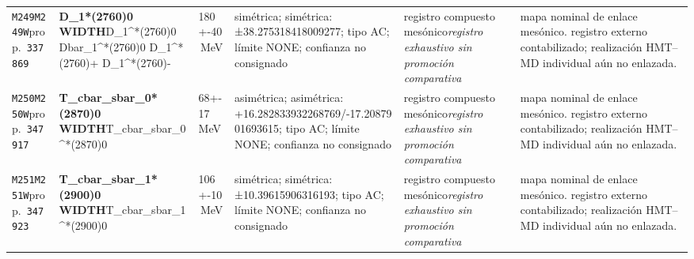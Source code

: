 \begin{landscape}
\begin{longtable}{L{1.85cm}L{4.45cm}L{2.35cm}L{4.05cm}L{3.35cm}L{7.15cm}}
\texttt{M249}\newline \texttt{M249W}\newline prop.\ \texttt{337869} & \textbf{D\_\allowbreak{}1*(2760)0 WIDTH}\newline D\_\allowbreak{}1\textasciicircum{}*(2760)0 \textbar{}\allowbreak{} Dbar\_\allowbreak{}1\textasciicircum{}*(2760)0 \textbar{}\allowbreak{} D\_\allowbreak{}1\textasciicircum{}*(2760)+ \textbar{}\allowbreak{} D\_\allowbreak{}1\textasciicircum{}*(2760)- & 180+-40\,MeV & simétrica; simétrica: ±38.275318418009277; tipo AC; límite NONE; confianza no consignado & registro compuesto mesónico\newline \emph{registro exhaustivo sin promoción comparativa} & mapa nominal de enlace mesónico. registro externo contabilizado; realización HMT--MD individual aún no enlazada. \\
\texttt{M250}\newline \texttt{M250W}\newline prop.\ \texttt{347917} & \textbf{T\_\allowbreak{}cbar\_\allowbreak{}sbar\_\allowbreak{}0*(2870)0 WIDTH}\newline T\_\allowbreak{}cbar\_\allowbreak{}sbar\_\allowbreak{}0\textasciicircum{}*(2870)0 & 68+-17\,MeV & asimétrica; asimétrica: +16.282833932268769/-17.2087901693615; tipo AC; límite NONE; confianza no consignado & registro compuesto mesónico\newline \emph{registro exhaustivo sin promoción comparativa} & mapa nominal de enlace mesónico. registro externo contabilizado; realización HMT--MD individual aún no enlazada. \\
\texttt{M251}\newline \texttt{M251W}\newline prop.\ \texttt{347923} & \textbf{T\_\allowbreak{}cbar\_\allowbreak{}sbar\_\allowbreak{}1*(2900)0 WIDTH}\newline T\_\allowbreak{}cbar\_\allowbreak{}sbar\_\allowbreak{}1\textasciicircum{}*(2900)0 & 106+-10\,MeV & simétrica; simétrica: ±10.39615906316193; tipo AC; límite NONE; confianza no consignado & registro compuesto mesónico\newline \emph{registro exhaustivo sin promoción comparativa} & mapa nominal de enlace mesónico. registro externo contabilizado; realización HMT--MD individual aún no enlazada. \\

\end{longtable}
\end{landscape}
